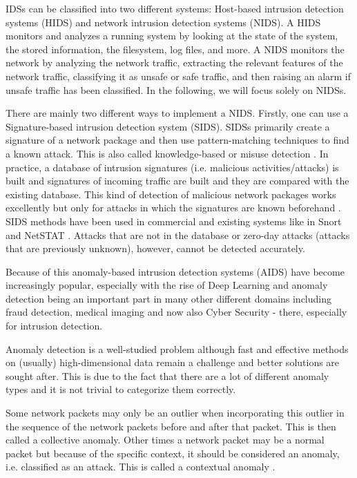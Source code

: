 \documentclass[]{article}
\begin{document}
	\noindent
	IDSs can be classified into two different systems: Host-based intrusion detection systems (HIDS) and network intrusion detection systems (NIDS). A HIDS monitors and analyzes a running system by looking at the state of the system, the stored information, the filesystem, log files, and more. A NIDS monitors the network by analyzing the network traffic, extracting the relevant features of the network traffic, classifying it as unsafe or safe traffic, and then raising an alarm if unsafe traffic has been classified. In the following, we will focus solely on NIDSs.
	\newline
	
	\noindent
	There are mainly two different ways to implement a NIDS. Firstly, one can use a Signature-based intrusion detection system (SIDS). SIDSs primarily create a signature of a network package and then use pattern-matching techniques to find a known attack. This is also called knowledge-based or misuse detection \cite{10.1007/978-3-030-04503-6_14}. In practice, a database of intrusion signatures (i.e. malicious activities/attacks) is built and signatures of incoming traffic are built and they are compared with the existing database. This kind of detection of malicious network packages works excellently but only for attacks in which the signatures are known beforehand \cite{10.1145/972374.972384}. SIDS methods have been used in commercial and existing systems like in Snort \cite{roesch1999snort} and NetSTAT \cite{vigna1999netstat}. Attacks that are not in the database or zero-day attacks (attacks that are previously unknown), however, cannot be detected accurately. 
	
	Because of this anomaly-based intrusion detection systems (AIDS) have become increasingly popular, especially with the rise of Deep Learning and anomaly detection being an important part in many other different domains including fraud detection, medical imaging and now also Cyber Security - there, especially for intrusion detection. 
	\newline
	
	\noindent
	Anomaly detection is a well-studied problem although fast and effective methods on (usually) high-dimensional data remain a challenge and better solutions are sought after.  This is due to the fact that there are a lot of different anomaly types and it is not trivial to categorize them correctly. 
	
	Some network packets may only be an outlier when incorporating this outlier in the sequence of the network packets before and after that packet. This is then called a collective anomaly. Other times a network packet may be a normal packet but because of the specific context, it should be considered an anomaly, i.e. classified as an attack. This is called a contextual anomaly \cite{10.1145/1541880.1541882}. 
	\newline
	
\end{document}
